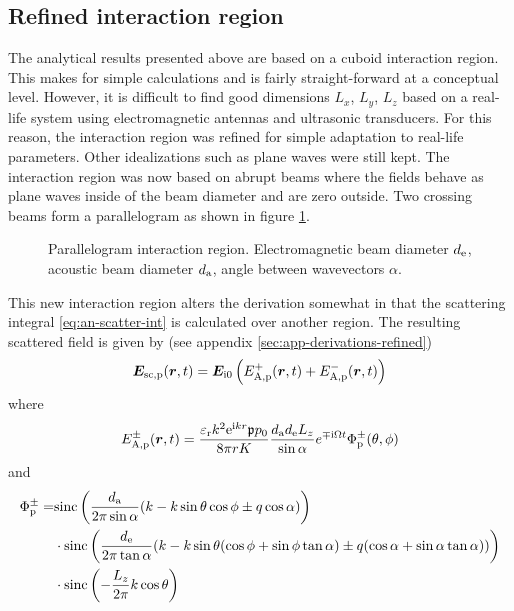 \documentclass[11pt,twoside]{eitExjobb}
\begin{document}
	\subsection{Refined interaction region} \label{sec:analytical-radar-refined}
	The analytical results presented above are based on a cuboid interaction region. This makes for simple calculations and is fairly straight-forward at a conceptual level. However, it is difficult to find good dimensions $L_x$, $L_y$, $L_z$ based on a real-life system using electromagnetic antennas and ultrasonic transducers. For this reason, the interaction region was refined for simple adaptation to real-life parameters. Other idealizations such as plane waves were still kept. The interaction region was now based on abrupt beams where the fields behave as plane waves inside of the beam diameter and are zero outside. Two crossing beams form a parallelogram as shown in figure \ref{fig:an-parallelogram}.
	\begin{figure}[h]
		\centering
		\resizebox{\textwidth}{!}{
			
		}
		\caption{\label{fig:an-parallelogram} Parallelogram interaction region. Electromagnetic beam diameter $d_{\mathrm{e}}$, acoustic beam diameter $d_{\mathrm{a}}$, angle between wavevectors $\alpha$.}
	\end{figure}
	This new interaction region alters the derivation somewhat in that the scattering integral \eqref{eq:an-scatter-int} is calculated over another region. The resulting scattered field is given by (see appendix \ref{sec:app-derivations-refined})
	\begin{equation*}
	\bm{E}_{\mathrm{sc,p}} (\bm{r},t) = \bm{E}_{\mathrm{i}0} \left( E_{\mathrm{A,p}}^+ (\bm{r},t) + E_{\mathrm{A,p}}^- (\bm{r},t) \right)
	\end{equation*}
	where
	\begin{equation*}
	E_{\mathrm{A,p}}^\pm (\bm{r},t) = \frac{\varepsilon_{\mathrm{r}}k^2 \mathrm{e}^{\mathrm{i} kr} \mathfrak{p} p_0}{8\pi r K} \frac{d_{\mathrm{a}} d_{\mathrm{e}} L_{z}}{\sin{\alpha}} e^{\mp \mathrm{i} \Omega t} \Phi_{\mathrm{p}}^\pm (\theta,\phi)
	\end{equation*}
	and
	\begin{equation*}
	\begin{split}
	\Phi_{\mathrm{p}}^\pm =& \text{sinc}\left( \frac{d_{\mathrm{a}}}{2\pi \sin{\alpha}}(k - k\sin{\theta}\cos{\phi} \pm q\cos{\alpha}) \right) \\
	&\cdot \text{sinc}\left( \frac{d_{\mathrm{e}}}{2\pi \tan{\alpha}}
	(k - k\sin{\theta}(\cos{\phi} + \sin{\phi}\tan{\alpha}) \pm q(\cos{\alpha} + \sin{\alpha}\tan{\alpha})) \right) \\
	&\cdot \text{sinc}\left( -\frac{L_{z}}{2\pi} k\cos{\theta} \right)
	\end{split}
	\end{equation*}
\end{document}
